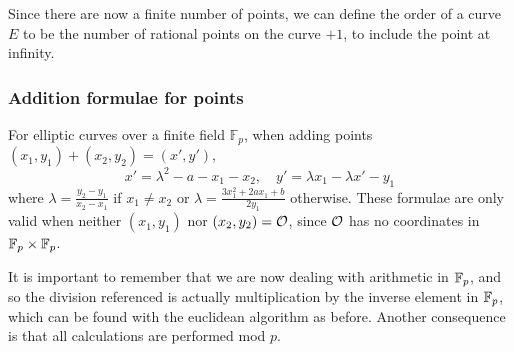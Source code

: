 Since there are now a finite number of points, we can define the order of a curve $E$ to be the number of rational points on the curve $+1$, to include the point at infinity.
\subsubsection{Addition formulae for points}
For elliptic curves over a finite field $\mathbb{F}_p$, when adding points $(x_1,y_1) + (x_2,y_2) = (x',y')$,
$$x'=\lambda^2 - a - x_1 - x_2,\quad y' = \lambda x_1 -\lambda x' - y_1 $$
where $\lambda = \frac{y_2-y_1}{x_2-x_1}$ if $x_1\neq x_2$ or $\lambda=\frac{3x_1^2 + 2ax_1 + b}{2y_1}$ otherwise.\cite{tate2013}
These formulae are only valid when neither $(x_1,y_1)$ nor $(x_2,y_2) = \mathcal{O}$, since $\mathcal{O}$ has no coordinates in $\mathbb{F}_{p} \times \mathbb{F}_{p}$.

It is important to remember that we are now dealing with arithmetic in $\mathbb{F}_{p}$, and so the division referenced is actually multiplication by the inverse element in $\mathbb{F}_{p}$, which can be found with the euclidean algorithm as before.
Another consequence is that all calculations are performed mod $p$.
